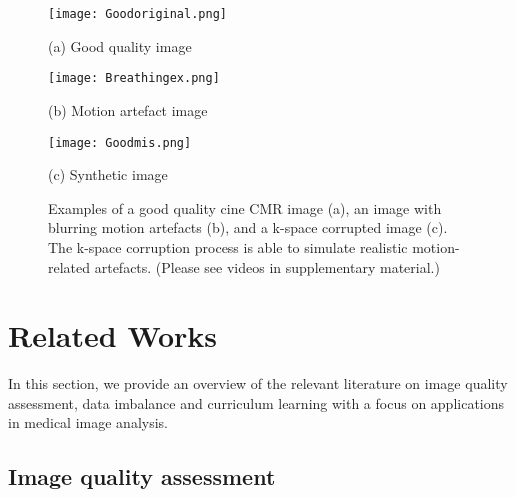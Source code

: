 \documentclass[preprint,12pt,authoryear]{elsarticle}
\begin{document}
 \begin{figure}[tb]

\begin{minipage}[b]{0.31\linewidth}
  \centering
  \centerline{\texttt{[image: Goodoriginal.png]}}
  \centerline{(a) Good quality image}\medskip
  \label{fig:Motivationa}
\end{minipage}
\hfill
\begin{minipage}[b]{0.31\linewidth}
  \centering
  \centerline{\texttt{[image: Breathingex.png]}}
  \centerline{(b) Motion artefact image}\medskip
  \label{fig:Motivationb}
\end{minipage}
%
\hfill
\begin{minipage}[b]{0.31\linewidth}
  \centering
  \centerline{\texttt{[image: Goodmis.png]}}
  \centerline{ (c) Synthetic image} \medskip
  \label{fig:Motivationc}
\end{minipage}
\hfill

\caption{Examples of a good quality cine CMR image (a), an image with blurring motion artefacts (b), and a k-space corrupted image (c). The k-space corruption process is able to simulate realistic motion-related artefacts. (Please see videos in supplementary material.)}
\label{fig:Mot}
%
\end{figure}








\section{Related Works}
\label{sec:Related}

In this section, we provide an overview of the relevant literature on image quality assessment, data imbalance and curriculum learning with a focus on applications in medical image analysis.

\subsection{Image quality assessment}
\label{sec:imq}
\end{document}
